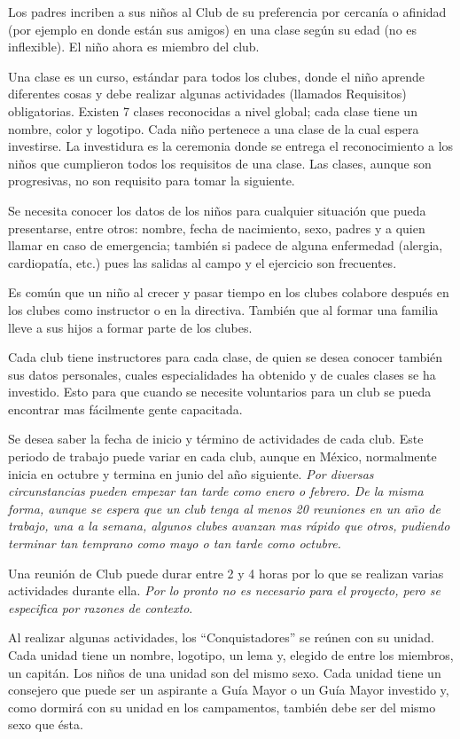 \documentclass[
  letterpaper,
  DIV=11,
  numbers=noendperiod]{scrreprt}
\begin{document}
Los padres incriben a sus niños al Club de su preferencia por cercanía o
afinidad (por ejemplo en donde están sus amigos) en una clase según su
edad (no es inflexible). El niño ahora es miembro del club.

Una clase es un curso, estándar para todos los clubes, donde el niño
aprende diferentes cosas y debe realizar algunas actividades (llamados
Requisitos) obligatorias. Existen 7 clases reconocidas a nivel global;
cada clase tiene un nombre, color y logotipo. Cada niño pertenece a una
clase de la cual espera investirse. La investidura es la ceremonia donde
se entrega el reconocimiento a los niños que cumplieron todos los
requisitos de una clase. Las clases, aunque son progresivas, no son
requisito para tomar la siguiente.

Se necesita conocer los datos de los niños para cualquier situación que
pueda presentarse, entre otros: nombre, fecha de nacimiento, sexo,
padres y a quien llamar en caso de emergencia; también si padece de
alguna enfermedad (alergia, cardiopatía, etc.) pues las salidas al campo
y el ejercicio son frecuentes.

Es común que un niño al crecer y pasar tiempo en los clubes colabore
después en los clubes como instructor o en la directiva. También que al
formar una familia lleve a sus hijos a formar parte de los clubes.

Cada club tiene instructores para cada clase, de quien se desea conocer
también sus datos personales, cuales especialidades ha obtenido y de
cuales clases se ha investido. Esto para que cuando se necesite
voluntarios para un club se pueda encontrar mas fácilmente gente
capacitada.

Se desea saber la fecha de inicio y término de actividades de cada club.
Este periodo de trabajo puede variar en cada club, aunque en México,
normalmente inicia en octubre y termina en junio del año siguiente.
\emph{Por diversas circunstancias pueden empezar tan tarde como enero o
febrero. De la misma forma, aunque se espera que un club tenga al menos
20 reuniones en un año de trabajo, una a la semana, algunos clubes
avanzan mas rápido que otros, pudiendo terminar tan temprano como mayo o
tan tarde como octubre.}

Una reunión de Club puede durar entre 2 y 4 horas por lo que se realizan
varias actividades durante ella. \emph{Por lo pronto no es necesario
para el proyecto, pero se especifica por razones de contexto}.

Al realizar algunas actividades, los ``Conquistadores'' se reúnen con su
unidad. Cada unidad tiene un nombre, logotipo, un lema y, elegido de
entre los miembros, un capitán. Los niños de una unidad son del mismo
sexo. Cada unidad tiene un consejero que puede ser un aspirante a Guía
Mayor o un Guía Mayor investido y, como dormirá con su unidad en los
campamentos, también debe ser del mismo sexo que ésta.
\end{document}
